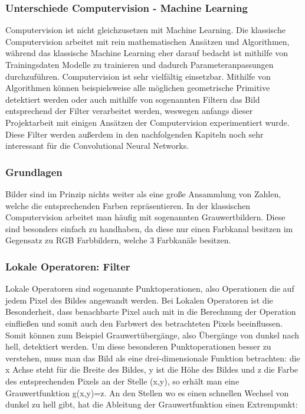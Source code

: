 \documentclass[11pt, a4paper]{article}
\begin{document}
\subsubsection{Unterschiede Computervision - Machine Learning}
Computervision ist nicht gleichzusetzen mit Machine Learning. Die klassische Computervision arbeitet mit rein mathematischen Ansätzen und Algorithmen, während das klassische Machine Learning eher darauf bedacht ist mithilfe von Trainingsdaten Modelle zu trainieren und dadurch Parameteranpassungen durchzuführen. Computervision ist sehr vielfältig einsetzbar. Mithilfe von Algorithmen können beispielsweise alle möglichen geometrische Primitive detektiert werden oder auch mithilfe von sogenannten Filtern das Bild entsprechend der Filter verarbeitet werden, weswegen anfangs dieser Projektarbeit mit einigen Ansätzen der Computervision experimentiert wurde. Diese Filter werden außerdem in den nachfolgenden Kapiteln noch sehr interessant für die Convolutional Neural Networks.

\subsubsection{Grundlagen}
Bilder sind im Prinzip nichts weiter als eine große Ansammlung von Zahlen, welche die entsprechenden Farben repräsentieren. In der klassischen Computervision arbeitet man häufig mit sogenannten Grauwertbildern. Diese sind besonders einfach zu handhaben, da diese nur einen Farbkanal besitzen im Gegensatz zu RGB Farbbildern, welche 3 Farbkanäle besitzen.

\subsubsection{Lokale Operatoren: Filter}
Lokale Operatoren sind sogenannte Punktoperationen, also Operationen die auf jedem Pixel des Bildes angewandt werden. Bei Lokalen Operatoren ist die Besonderheit, dass benachbarte Pixel auch mit in die Berechnung der Operation einfließen und somit auch den Farbwert des betrachteten Pixels beeinflussen. Somit können zum Beispiel Grauwertübergänge, also Übergänge von dunkel nach hell, detektiert werden. Um diese besonderen Punktoperationen besser zu verstehen, muss man das Bild als eine drei-dimensionale Funktion betrachten: die x Achse steht für die Breite des Bildes, y ist die Höhe des Bildes und z die Farbe des entsprechenden Pixels an der Stelle (x,y), so erhält man eine Grauwertfunktion g(x,y)=z. An den Stellen wo es einen schnellen Wechsel von dunkel zu hell gibt, hat die Ableitung der Grauwertfunktion einen Extrempunkt:
\newline
\end{document}
